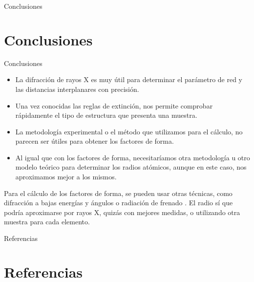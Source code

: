\documentclass{beamer}
\begin{document}
\begin{frame}{Conclusiones}
    \section{Conclusiones}
    \begin{block}{Conclusiones}
        \begin{itemize}
            \item La difracción de rayos X es muy útil para determinar el parámetro de red y las distancias interplanares con precisión.
            \item Una vez conocidas las reglas de extinción, nos permite comprobar rápidamente el tipo de estructura que presenta una muestra.
            \item La metodología experimental o el método que utilizamos para el cálculo, no parecen ser útiles para obtener los factores de forma.
            \item Al igual que con los factores de forma, necesitaríamos otra metodología u otro modelo teórico para determinar los radios atómicos, aunque en este caso, nos aproximamos mejor a los mismos.
        \end{itemize}
    \end{block}
    Para el cálculo de los factores de forma, se pueden usar otras técnicas, como difracción a bajas energías y ángulos \cite{PhysRevLett.21.1388} o radiación de frenado \cite{PhysRevB.44.9248}. El radio sí que podría aproximarse por rayos X, quizás con mejores medidas, o utilizando otra muestra para cada elemento.
\end{frame}
\begin{frame}[allowframebreaks]{Referencias}
    \section{Referencias}
    \printbibliography
\end{frame}
\end{document}
